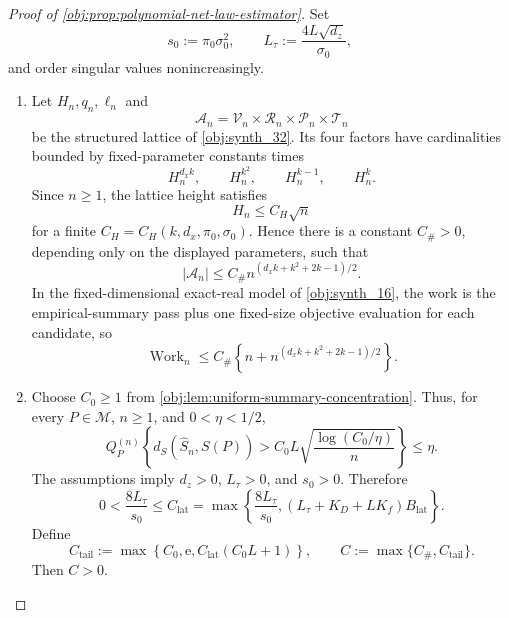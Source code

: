 \begin{proof}[Proof of \cref{obj:prop:polynomial-net-law-estimator}]
Set
\[
s_0:=\pi_0\sigma_0^2,\qquad
L_\tau:=\frac{4L\sqrt{d_z}}{\sigma_0},
\]
and order singular values nonincreasingly.

\begin{enumerate}
\item Let \(H_n,q_n,\ell_n\) and
\[
\mathcal A_n=\mathcal V_n\times\mathcal R_n\times\mathcal P_n\times\mathcal T_n
\]
be the structured lattice of \cref{obj:synth_32}.  Its four factors have cardinalities bounded by fixed-parameter constants times
\[
H_n^{d_xk},\qquad H_n^{k^2},\qquad H_n^{k-1},\qquad H_n^k .
\]
Since \(n\ge1\), the lattice height satisfies
\[
H_n\le C_H\sqrt n
\]
for a finite \(C_H=C_H(k,d_x,\pi_0,\sigma_0)\).  Hence there is a constant
\(C_\#>0\), depending only on the displayed parameters, such that
\[
|\mathcal A_n|
\le C_\# n^{(d_xk+k^2+2k-1)/2}.
\]
In the fixed-dimensional exact-real model of \cref{obj:synth_16}, the work is the empirical-summary pass plus one fixed-size objective evaluation for each candidate, so
\[
\operatorname{Work}_n
\le
C_\#\left\{n+n^{(d_xk+k^2+2k-1)/2}\right\}.
\] %

\item Choose \(C_0\ge1\) from \cref{obj:lem:uniform-summary-concentration}.  Thus, for every \(P\in\mathcal M\), \(n\ge1\), and \(0<\eta<1/2\),
\[
Q_P^{(n)}
\left\{
d_S(\widehat S_n,S(P))
>
C_0L\sqrt{\frac{\log(C_0/\eta)}{n}}
\right\}
\le\eta .
\]
The assumptions imply \(d_z>0\), \(L_\tau>0\), and \(s_0>0\).  Therefore
\[
0<\frac{8L_\tau}{s_0}
\le
C_{\mathrm{lat}}
=
\max\!\left\{\frac{8L_\tau}{s_0},
(L_\tau+K_D+LK_f)B_{\mathrm{lat}}\right\}.
\]
Define
\[
C_{\mathrm{tail}}
:=
\max\!\left\{C_0,\mathrm e,C_{\mathrm{lat}}(C_0L+1)\right\},
\qquad
C:=\max\{C_\#,C_{\mathrm{tail}}\}.
\]
Then \(C>0\). %


\end{enumerate}
\end{proof}
